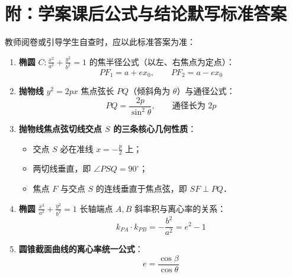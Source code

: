 \documentclass[11pt,a4paper]{ctexart}
\begin{document}
\section{附：学案课后公式与结论默写标准答案}
教师阅卷或引导学生自查时，应以此标准答案为准：
\begin{enumerate}[label=\arabic*.]
  \item \textbf{椭圆} $C: \frac{x^2}{a^2} + \frac{y^2}{b^2} = 1$ 的焦半径公式（以左、右焦点为定点）：
        \[ PF_1 = a + ex_0,\qquad PF_2 = a - ex_0 \]
  \item \textbf{抛物线} $y^2 = 2px$ 焦点弦长 $PQ$（倾斜角为 $\theta$）与通径公式：
        \[ PQ = \frac{2p}{\sin^2\theta},\qquad \text{通径长为 } 2p \]
  \item \textbf{抛物线焦点弦切线交点 $S$ 的三条核心几何性质}：
        \begin{itemize}[itemsep=0.2em]
          \item 交点 $S$ 必在准线 $x = -\frac{p}{2}$ 上；
          \item 两切线垂直，即 $\angle PSQ = 90^\circ$；
          \item 焦点 $F$ 与交点 $S$ 的连线垂直于焦点弦，即 $SF \perp PQ$．
        \end{itemize}
  \item \textbf{椭圆} $\frac{x^2}{a^2} + \frac{y^2}{b^2} = 1$ 长轴端点 $A, B$ 斜率积与离心率的关系：
        \[ k_{PA} \cdot k_{PB} = -\frac{b^2}{a^2} = e^2 - 1 \]
  \item \textbf{圆锥截面曲线的离心率统一公式}：
        \[ e = \frac{\cos\beta}{\cos\theta} \]
\end{enumerate}
\end{document}
